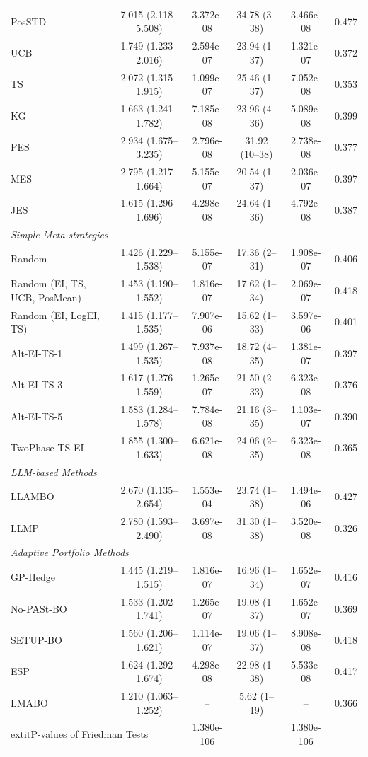 \begin{table}
\begin{tabular}{@{}lccccc@{}}
PosSTD & 7.015 (2.118--5.508) & 3.372e-08 & 34.78 (3--38) & 3.466e-08 & 0.477 \\
UCB & 1.749 (1.233--2.016) & 2.594e-07 & 23.94 (1--37) & 1.321e-07 & 0.372 \\
TS & 2.072 (1.315--1.915) & 1.099e-07 & 25.46 (1--37) & 7.052e-08 & 0.353 \\
KG & 1.663 (1.241--1.782) & 7.185e-08 & 23.96 (4--36) & 5.089e-08 & 0.399 \\
PES & 2.934 (1.675--3.235) & 2.796e-08 & 31.92 (10--38) & 2.738e-08 & 0.377 \\
MES & 2.795 (1.217--1.664) & 5.155e-07 & 20.54 (1--37) & 2.036e-07 & 0.397 \\
JES & 1.615 (1.296--1.696) & 4.298e-08 & 24.64 (1--36) & 4.792e-08 & 0.387 \\
\midrule
\multicolumn{5}{l}{\textit{Simple Meta-strategies}} \\
Random & 1.426 (1.229--1.538) & 5.155e-07 & 17.36 (2--31) & 1.908e-07 & 0.406 \\
Random (EI, TS, UCB, PosMean) & 1.453 (1.190--1.552) & 1.816e-07 & 17.62 (1--34) & 2.069e-07 & 0.418 \\
Random (EI, LogEI, TS) & 1.415 (1.177--1.535) & 7.907e-06 & 15.62 (1--33) & 3.597e-06 & 0.401 \\
Alt-EI-TS-1 & 1.499 (1.267--1.535) & 7.937e-08 & 18.72 (4--35) & 1.381e-07 & 0.397 \\
Alt-EI-TS-3 & 1.617 (1.276--1.559) & 1.265e-07 & 21.50 (2--33) & 6.323e-08 & 0.376 \\
Alt-EI-TS-5 & 1.583 (1.284--1.578) & 7.784e-08 & 21.16 (3--35) & 1.103e-07 & 0.390 \\
TwoPhase-TS-EI & 1.855 (1.300--1.633) & 6.621e-08 & 24.06 (2--35) & 6.323e-08 & 0.365 \\
\midrule
\multicolumn{5}{l}{\textit{LLM-based Methods}} \\
LLAMBO & 2.670 (1.135--2.654) & 1.553e-04 & 23.74 (1--38) & 1.494e-06 & 0.427 \\
LLMP & 2.780 (1.593--2.490) & 3.697e-08 & 31.30 (1--38) & 3.520e-08 & 0.326 \\
\midrule
\multicolumn{5}{l}{\textit{Adaptive Portfolio Methods}} \\
GP-Hedge & 1.445 (1.219--1.515) & 1.816e-07 & 16.96 (1--34) & 1.652e-07 & 0.416 \\
No-PASt-BO & 1.533 (1.202--1.741) & 1.265e-07 & 19.08 (1--37) & 1.652e-07 & 0.369 \\
SETUP-BO & 1.560 (1.206--1.621) & 1.114e-07 & 19.06 (1--37) & 8.908e-08 & 0.418 \\
ESP & 1.624 (1.292--1.674) & 4.298e-08 & 22.98 (1--38) & 5.533e-08 & 0.417 \\
\midrule
LMABO & 1.210 (1.063--1.252) & -- & 5.62 (1--19) & -- & 0.366 \\
\multicolumn{2}{l}{	extit{P-values of Friedman Tests}} & 1.380e-106 & & 1.380e-106 & \
\bottomrule
    \end{tabular}
    \end{table}
    